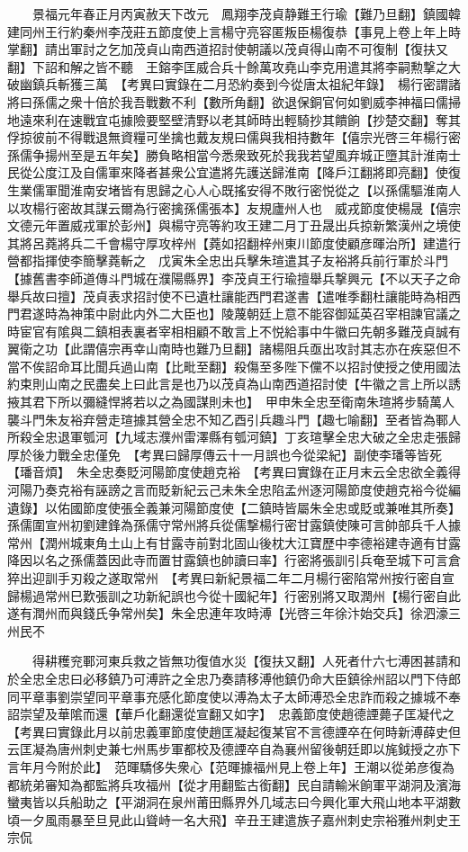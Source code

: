　　景福元年春正月丙寅赦天下改元　鳳翔李茂貞静難王行瑜【難乃旦翻】鎮國韓建同州王行約秦州李茂莊五節度使上言楊守亮容匿叛臣楊復恭【事見上卷上年上時掌翻】請出軍討之乞加茂貞山南西道招討使朝議以茂貞得山南不可復制【復扶又翻】下詔和解之皆不聽　王鎔李匡威合兵十餘萬攻堯山李克用遣其將李嗣勲撃之大破幽鎮兵斬獲三萬　【考異曰實錄在二月恐約奏到今從唐太祖紀年錄】　楊行密謂諸將曰孫儒之衆十倍於我吾戰數不利【數所角翻】欲退保銅官何如劉威李神福曰儒掃地遠來利在速戰宜屯據險要堅壁清野以老其師時出輕騎抄其饋餉【抄楚交翻】奪其俘掠彼前不得戰退無資糧可坐擒也戴友規曰儒與我相持數年【僖宗光啓三年楊行密孫儒争揚州至是五年矣】勝負略相當今悉衆致死於我我若望風弃城正墮其計淮南士民從公度江及自儒軍來降者甚衆公宜遣將先護送歸淮南【降戶江翻將即亮翻】使復生業儒軍聞淮南安堵皆有思歸之心人心既搖安得不敗行密悦從之【以孫儒驅淮南人以攻楊行密故其謀云爾為行密擒孫儒張本】友規廬州人也　威戎節度使楊晟【僖宗文德元年置威戎軍於彭州】與楊守亮等約攻王建二月丁丑晟出兵掠新繁漢州之境使其將呂蕘將兵二千會楊守厚攻梓州【蕘如招翻梓州東川節度使顧彦暉治所】建遣行營都指揮使李簡擊蕘斬之　戊寅朱全忠出兵擊朱瑄遣其子友裕將兵前行軍於斗門【據舊書李師道傳斗門城在濮陽縣界】李茂貞王行瑜擅舉兵撃興元【不以天子之命舉兵故曰擅】茂貞表求招討使不已遺杜讓能西門君遂書【遣唯季翻杜讓能時為相西門君遂時為神策中尉此内外二大臣也】陵蔑朝廷上意不能容御延英召宰相諫官議之時宦官有隂與二鎮相表裏者宰相相顧不敢言上不悦給事中牛徽曰先朝多難茂貞誠有翼衛之功【此謂僖宗再幸山南時也難乃旦翻】諸楊阻兵亟出攻討其志亦在疾惡但不當不俟詔命耳比聞兵過山南【比毗至翻】殺傷至多陛下儻不以招討使授之使用國法約束則山南之民盡矣上曰此言是也乃以茂貞為山南西道招討使【牛徽之言上所以誘掖其君下所以彌縫悍將若以之為國謀則未也】　甲申朱全忠至衛南朱瑄將步騎萬人襲斗門朱友裕弃營走瑄據其營全忠不知乙酉引兵趣斗門【趣七喻翻】至者皆為鄆人所殺全忠退軍瓠河【九域志濮州雷澤縣有瓠河鎮】丁亥瑄擊全忠大破之全忠走張歸厚於後力戰全忠僅免　【考異曰歸厚傳云十一月誤也今從梁紀】副使李璠等皆死【璠音煩】　朱全忠奏貶河陽節度使趙克裕　【考異曰實錄在正月末云全忠欲全義得河陽乃奏克裕有誣謗之言而貶新紀云己未朱全忠陷孟州逐河陽節度使趙克裕今從編遺錄】以佑國節度使張全義兼河陽節度使【二鎮時皆屬朱全忠或貶或兼唯其所奏】　孫儒圍宣州初劉建鋒為孫儒守常州將兵從儒撃楊行密甘露鎮使陳可言帥部兵千人據常州【潤州城東角土山上有甘露寺前對北固山後枕大江寶歷中李德裕建寺適有甘露降因以名之孫儒蓋因此寺而置甘露鎮也帥讀曰率】行密將張訓引兵奄至城下可言倉猝出迎訓手刃殺之遂取常州　【考異曰新紀景福二年二月楊行密陷常州按行密自宣歸楊過常州巳歎張訓之功新紀誤也今從十國紀年】行密别將又取潤州【楊行密自此遂有潤州而與錢氏争常州矣】朱全忠連年攻時溥【光啓三年徐汴始交兵】徐泗濠三州民不

　　得耕穫兖鄆河東兵救之皆無功復值水災【復扶又翻】人死者什六七溥困甚請和於全忠全忠曰必移鎮乃可溥許之全忠乃奏請移溥他鎮仍命大臣鎮徐州詔以門下侍郎同平章事劉崇望同平章事充感化節度使以溥為太子太師溥恐全忠詐而殺之據城不奉詔崇望及華隂而還【華戶化翻還從宣翻又如字】　忠義節度使趙德諲薨子匡凝代之　【考異曰實錄此月以前忠義軍節度使趙匡凝起復某官不言德諲卒在何時新溥薛史但云匡凝為唐州刺史兼七州馬步軍都校及德諲卒自為襄州留後朝廷即以旄鉞授之亦下言年月今附於此】　范暉驕侈失衆心【范暉據福州見上卷上年】王潮以從弟彦復為都統弟審知為都監將兵攻福州【從才用翻監古銜翻】民自請輸米餉軍平湖洞及濱海蠻夷皆以兵船助之【平湖洞在泉州莆田縣界外几域志曰今興化軍大飛山地本平湖數頃一夕風雨暴至旦見此山聳峙一名大飛】辛丑王建遣族子嘉州刺史宗裕雅州刺史王宗侃

